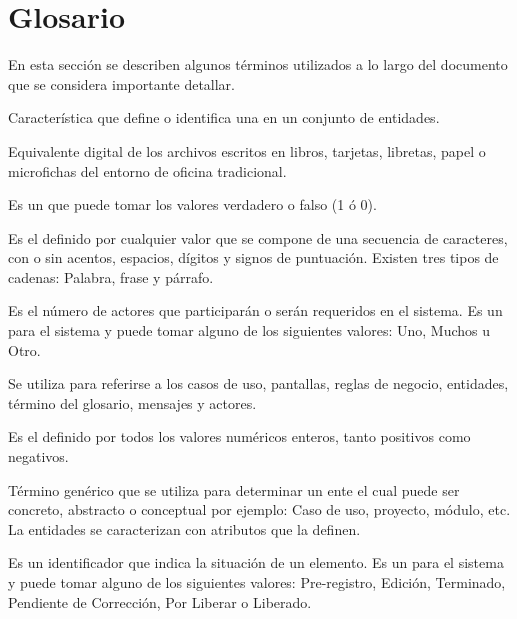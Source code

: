 \section{Glosario}
\label{sec:glosario}
    En esta sección se describen algunos términos utilizados a lo largo del documento que se considera importante detallar. 
  
\begin{description}
	 Característica que define o identifica una  en un conjunto de entidades.

	 Equivalente digital de los archivos escritos en libros, tarjetas, libretas, papel o microfichas del entorno de oficina tradicional.

	 Es un  que puede tomar los valores verdadero o falso (1 ó 0).
	
	 Es el  definido por cualquier valor que se compone de una secuencia de caracteres, con o sin acentos, espacios, dígitos y 
	signos de puntuación. Existen tres tipos de cadenas: Palabra, frase y párrafo.
	
	 Es el número de actores que participarán o serán requeridos en el sistema. Es un  para el sistema y puede tomar alguno de los siguientes valores:
	Uno, Muchos u Otro.

	 Se utiliza para referirse a los casos de uso, pantallas, reglas de negocio, entidades, término del glosario, mensajes y actores.
	
	 Es el   definido por todos los valores numéricos enteros, tanto positivos como negativos.
	
	 Término genérico que se utiliza para determinar un ente el cual puede ser concreto, abstracto o conceptual por ejemplo: Caso de uso, 
		proyecto, módulo, etc. La entidades se caracterizan con atributos que la definen.		
		
	 Es un identificador que indica la situación de un elemento. Es un  para el sistema y puede tomar alguno de los siguientes valores:
	Pre-registro, Edición, Terminado, Pendiente de Corrección, Por Liberar o Liberado.
	

\end{description}
